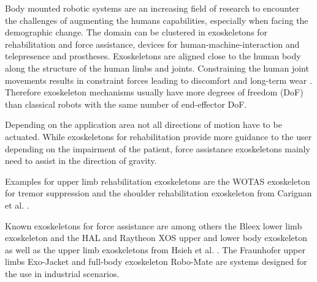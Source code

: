 \documentclass[twocolumn,10pt]{IFTOMM}
\begin{document}
Body mounted robotic systems are an increasing field of research to encounter the challenges of augmenting the humans capabilities, especially when facing the demographic change.
The domain can be clustered in exoskeletons for rehabilitation and force assistance, devices for human-machine-interaction and telepresence and prostheses.
Exoskeletons are aligned close to the human body along the structure of the human limbs and joints.
Constraining the human joint movements results in constraint forces leading to discomfort and long-term wear \cite{Pons2008}.
%
Therefore exoskeleton mechanisms usually have more degrees of freedom (DoF) than classical robots with the same number of end-effector DoF.


Depending on the application area not all directions of motion have to be actuated.
While exoskeletons for rehabilitation provide more guidance to the user depending on the impairment of the patient, force assistance exoskeletons mainly need to assist in the direction of gravity.
%
%

Examples for upper limb rehabilitation exoskeletons are the WOTAS exoskeleton for tremor suppression \cite{RoconBelRuiMan2007} and the shoulder rehabilitation exoskeleton from Carignan et al. \cite{CarignanLis2005}.

Known exoskeletons for force assistance are among others the Bleex lower limb exoskeleton \cite{ChuKazZos2005} and the HAL \cite{Sankai2010} and Raytheon XOS upper and lower body exoskeleton as well as the upper limb exoskeletons from Hsieh et al. \cite{HsiehChiLan2015}. 
The Fraunhofer upper limbs Exo-Jacket \cite{Ebrahimi2017} and full-body exoskeleton Robo-Mate \cite{StadlerAltSchSch2017} are systems designed for the use in industrial scenarios.
\end{document}
